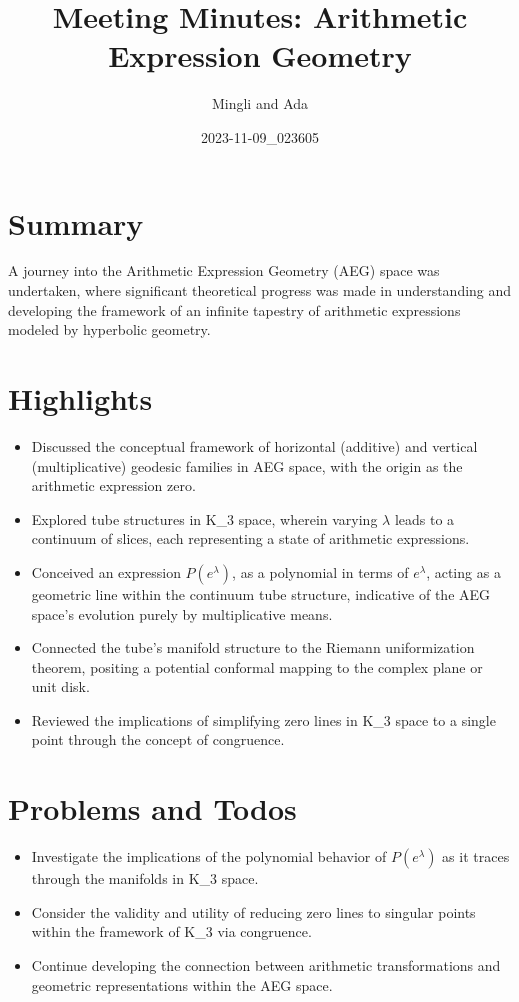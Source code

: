 \documentclass{article}
\title{Meeting Minutes: Arithmetic Expression Geometry}
\author{Mingli and Ada}
\date{2023-11-09_023605}
\begin{document}
\maketitle

\section*{Summary}
A journey into the Arithmetic Expression Geometry (AEG) space was undertaken, where significant theoretical progress was made in understanding and developing the framework of an infinite tapestry of arithmetic expressions modeled by hyperbolic geometry.

\section*{Highlights}
\begin{itemize}
    \item Discussed the conceptual framework of horizontal (additive) and vertical (multiplicative) geodesic families in AEG space, with the origin as the arithmetic expression zero.
    \item Explored tube structures in K_3 space, wherein varying $\lambda$ leads to a continuum of slices, each representing a state of arithmetic expressions.
    \item Conceived an expression $P(e^\lambda)$, as a polynomial in terms of $e^\lambda$, acting as a geometric line within the continuum tube structure, indicative of the AEG space's evolution purely by multiplicative means.
    \item Connected the tube's manifold structure to the Riemann uniformization theorem, positing a potential conformal mapping to the complex plane or unit disk.
    \item Reviewed the implications of simplifying zero lines in K_3 space to a single point through the concept of congruence. 
\end{itemize}

\section*{Problems and Todos}
\begin{itemize}
    \item Investigate the implications of the polynomial behavior of $P(e^\lambda)$ as it traces through the manifolds in K_3 space.
    \item Consider the validity and utility of reducing zero lines to singular points within the framework of K_3 via congruence.
    \item Continue developing the connection between arithmetic transformations and geometric representations within the AEG space.
\end{itemize}
\end{document}
